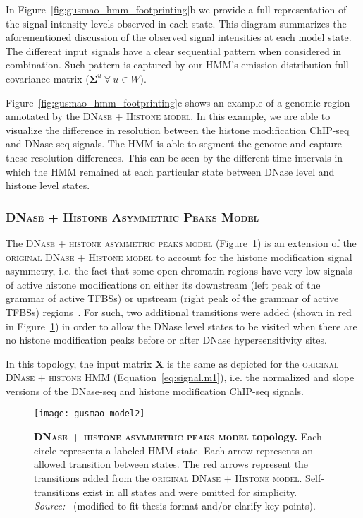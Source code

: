 In Figure~\ref{fig:gusmao_hmm_footprinting}b we provide a full representation of the signal intensity levels observed in each state. This diagram summarizes the aforementioned discussion of the observed signal intensities at each model state. The different input signals have a clear sequential pattern when considered in combination. Such pattern is captured by our HMM's emission distribution full covariance matrix (${{\boldsymbol\Sigma}^{u}} \  \forall \  u \in W$).

Figure~\ref{fig:gusmao_hmm_footprinting}c shows an example of a genomic region annotated by the \textsc{DNase + Histone model}. In this example, we are able to visualize the difference in resolution between the histone modification ChIP-seq and DNase-seq signals. The HMM is able to segment the genome and capture these resolution differences. This can be seen by the different time intervals in which the HMM remained at each particular state between DNase level and histone level states.

\subsubsection{\textsc{DNase + Histone Asymmetric Peaks Model}}

The \textsc{DNase + histone asymmetric peaks model} (Figure~\ref{fig:gusmao_model2}) is an extension of the \textsc{original DNase + Histone model} to account for the histone modification signal asymmetry, i.e. the fact that some open chromatin regions have very low signals of active histone modifications on either its downstream (left peak of the grammar of active TFBSs) or upstream (right peak of the grammar of active TFBSs) regions~\citep{kundaje2012}. For such, two additional transitions were added (shown in red in Figure~\ref{fig:gusmao_model2}) in order to allow the DNase level states to be visited when there are no histone modification peaks before or after DNase hypersensitivity sites.

In this topology, the input matrix $\mathbf{X}$ is the same as depicted for the \textsc{original DNase + histone} HMM (Equation~\ref{eq:signal.m1}), i.e. the normalized and slope versions of the DNase-seq and histone modification ChIP-seq signals.

\begin{figure}[h!]
\centering
\texttt{[image: gusmao\_model2]}
\caption[\textsc{DNase + histone asymmetric peaks model} topology]{\textbf{\textsc{DNase + histone asymmetric peaks model} topology.} Each circle represents a labeled HMM state. Each arrow represents an allowed transition between states. The red arrows represent the transitions added from the \textsc{original DNase + Histone model}. Self-transitions exist in all states and were omitted for simplicity. \emph{Source:~\cite{gusmao2014}} (modified to fit thesis format and/or clarify key points).}
\label{fig:gusmao_model2}
\end{figure}

